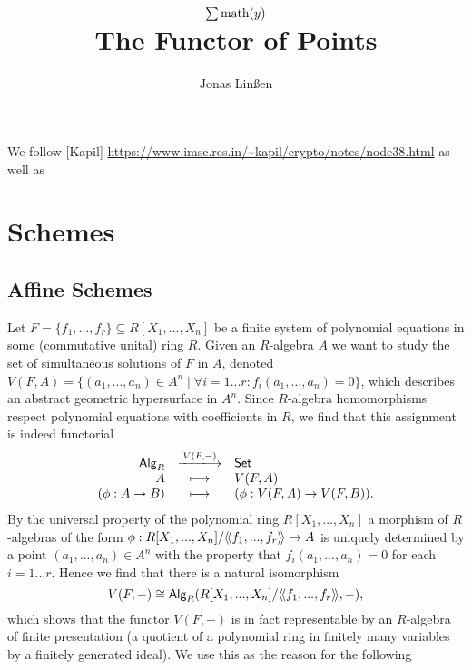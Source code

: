 

\usepackage{extarrows}

\title{$\sum \text{math}(y)$\\The Functor of Points}
\author{Jonas Linßen}



	\maketitle
	\tableofcontents

	We follow [Kapil] \url{https://www.imsc.res.in/~kapil/crypto/notes/node38.html} as well as 


	\newpage
	\section{Schemes}
	\subsection{Affine Schemes}

	Let $F=\{f_1,...,f_r\} \subseteq R[X_1,...,X_n]$ be a finite system of polynomial equations in some (commutative unital) ring $R$. Given an $R$-algebra $A$ we want to study the set of simultaneous solutions of $F$ in $A$, denoted $V(F,A)=\{(a_1,...,a_n) \in A^n \mid \forall i=1 ... r: f_i(a_1,...,a_n) = 0 \}$, which describes an abstract geometric hypersurface in $A^n$.
	Since $R$-algebra homomorphisms respect polynomial equations with coefficients in $R$, we find that this assignment is indeed functorial
	\begin{equation*}
		\begin{array}{rcl}
			\ncat{Alg}_R&\xlongrightarrow{V(F,-)}&\ncat{Set}\\
			A&\longmapsto&V(F,A)\\
			(\phi:A\rightarrow B)&\longmapsto&(\phi:V(F,A)\rightarrow V(F,B)).
		\end{array}
	\end{equation*}
	By the universal property of the polynomial ring $R[X_1,...,X_n]$ a morphism of $R$-algebras of the form $\phi:R[X_1,...,X_n]/\langle\!\langle f_1,...,f_r \rangle\!\rangle \rightarrow A$ is uniquely determined by a point $(a_1,...,a_n)\in A^n$ with the property that $f_i(a_1,...,a_n)=0$ for each $i=1...r$. Hence we find that there is a natural isomorphism 
	\begin{equation*}
		V(F,-) \cong \textsf{Alg}_R(R[X_1,...,X_n]/\langle\!\langle f_1,...,f_r \rangle\!\rangle,-),
	\end{equation*}
	which shows that the functor $V(F,-)$ is in fact representable by an $R$-algebra of finite presentation (a quotient of a polynomial ring in finitely many variables by a finitely generated ideal). We use this as the reason for the following

